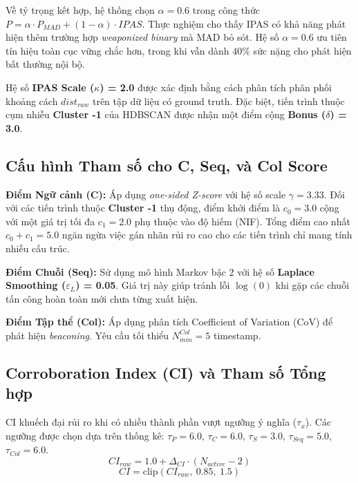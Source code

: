 \documentclass[../main.tex]{subfiles}
\begin{document}
Về tỷ trọng kết hợp, hệ thống chọn \textbf{$\alpha = 0.6$} trong công thức $P = \alpha \cdot P_{MAD} + (1-\alpha) \cdot IPAS$. Thực nghiệm cho thấy IPAS có khả năng phát hiện thêm trường hợp \textit{weaponized binary} mà MAD bỏ sót. Hệ số $\alpha = 0.6$ ưu tiên tín hiệu toàn cục vững chắc hơn, trong khi vẫn dành 40\% sức nặng cho phát hiện bất thường nội bộ.

Hệ số \textbf{IPAS Scale ($\kappa$) = 2.0} được xác định bằng cách phân tích phân phối khoảng cách $dist_{raw}$ trên tập dữ liệu có ground truth. Đặc biệt, tiến trình thuộc cụm nhiễu \textbf{Cluster -1} của HDBSCAN được nhận một điểm cộng \textbf{Bonus ($\delta$) = 3.0}.

\subsection{Cấu hình Tham số cho C, Seq, và Col Score}
\label{subsection:3.7.2}

\textbf{Điểm Ngữ cảnh (C):} Áp dụng \textit{one-sided Z-score} với hệ số scale \textbf{$\gamma = 3.33$}. Đối với các tiến trình thuộc \textbf{Cluster -1} thụ động, điểm khởi điểm là $c_0 = 3.0$ cộng với một giá trị tối đa $c_1 = 2.0$ phụ thuộc vào độ hiếm (NIF). Tổng điểm cao nhất $c_0 + c_1 = 5.0$ ngăn ngừa việc gán nhãn rủi ro cao cho các tiến trình chỉ mang tính nhiễu cấu trúc.

\textbf{Điểm Chuỗi (Seq):} Sử dụng mô hình Markov bậc 2 với hệ số \textbf{Laplace Smoothing ($\varepsilon_L$) = 0.05}. Giá trị này giúp tránh lỗi $\log(0)$ khi gặp các chuỗi tấn công hoàn toàn mới chưa từng xuất hiện.

\textbf{Điểm Tập thể (Col):} Áp dụng phân tích Coefficient of Variation (CoV) để phát hiện \textit{beaconing}. Yêu cầu tối thiểu \textbf{$N_{min}^{Col} = 5$} timestamp.

\subsection{Corroboration Index (CI) và Tham số Tổng hợp}
\label{subsection:3.7.3}

CI khuếch đại rủi ro khi có nhiều thành phần vượt ngưỡng ý nghĩa ($\tau_x$). Các ngưỡng được chọn dựa trên thống kê: $\tau_P = 6.0$, $\tau_C = 6.0$, $\tau_S = 3.0$, $\tau_{Seq} = 5.0$, $\tau_{Col} = 6.0$.
\begin{equation}
    CI_{raw} = 1.0 + \Delta_{CI} \cdot (N_{active} - 2) \tag{2.2}
\end{equation}
\begin{equation}
    CI = \text{clip}(CI_{raw},\ 0.85,\ 1.5) \tag{2.3}
\end{equation}
\end{document}
